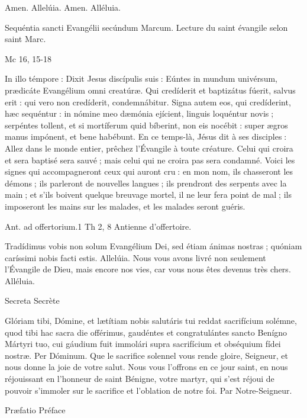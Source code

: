 \begin{paracol}{2}
Amen. Allelúia.
\switchcolumn
Amen. Alléluia.
\switchcolumn*

Sequéntia sancti Evangélii secúndum Marcum.
\switchcolumn
Lecture du saint évangile selon saint Marc.
\switchcolumn*

Mc 16, 15-18
\switchcolumn

\switchcolumn*

In illo témpore : Dixit Jesus discípulis  suis : Eúntes in mundum univérsum, prædicáte Evangélium omni creatúræ. Qui credíderit et baptizátus fúerit, salvus erit : qui vero non credíderit, condemnábitur. Signa autem eos, qui credíderint, hæc sequéntur : in nómine meo dæmónia ejícient, linguis loquéntur novis ; serpéntes tollent, et si mortíferum quid bíberint, non eis nocébit : super ægros manus impónent, et bene habébunt.
\switchcolumn
En ce temps-là, Jésus dit à ses disciples :  Allez dans le monde entier, prêchez l’Évangile à toute créature. Celui qui croira et sera baptisé sera sauvé ; mais celui qui ne croira pas sera condamné. Voici les signes qui accompagneront ceux qui auront cru : en mon nom, ils chasseront les démons ; ils parleront de nouvelles langues ; ils prendront des serpents avec la main ; et s’ils boivent quelque breuvage mortel, il ne leur fera point de mal ; ils imposeront les mains sur les malades, et les malades seront guéris.
\switchcolumn*

Ant. ad offertorium.\hfill 1 Th 2, 8
\switchcolumn
Antienne d’offertoire.
\switchcolumn*

Tradídimus vobis non solum Evangélium Dei, sed étiam ánimas nostras ; quóniam caríssimi nobis facti estis. Allelúia.
\switchcolumn
Nous vous avons livré non seulement l’Évangile de Dieu, mais encore nos vies, car vous nous êtes devenus très chers. Alléluia.
\switchcolumn*

Secreta
\switchcolumn
Secrète
\switchcolumn*

Glóriam tibi, Dómine, et lætítiam  nobis salutáris tui reddat sacrifícium solémne, quod tibi hac sacra die offérimus, gaudéntes et congratulántes sancto Benígno Mártyri tuo, cui gáudium fuit immolári supra sacrifícium et obséquium fídei nostræ. Per Dóminum.
\switchcolumn
Que le sacrifice solennel vous rende  gloire, Seigneur, et nous donne la joie de votre salut. Nous vous l’offrons en ce jour saint, en nous réjouissant en l’honneur de saint Bénigne, votre martyr, qui s’est réjoui de pouvoir s’immoler sur le sacrifice et l’oblation de notre foi. Par Notre-Seigneur.
\switchcolumn*

Præfatio
\switchcolumn
Préface
\switchcolumn*


\end{paracol}
